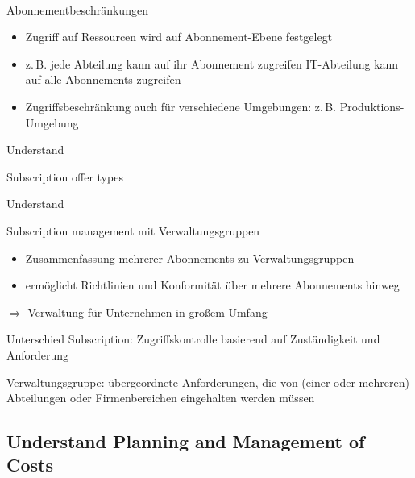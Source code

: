 \documentclass{scrartcl}
\newenvironment{flashcard}[2][]{%
    #1
    \vfill
    \centerline{\Large{#2}}
    \vfill
\newpage
}
{\newpage}
\newcommand{\subsectioncard}[1]{
    \vspace*{\stretch{1}}
    \subsection{#1}
    \vspace*{\stretch{1}}
    \pagebreak
}
\begin{document}
    \begin{flashcard}[\ ]{Abonnementbeschränkungen}
        \begin{itemize}
            \item Zugriff auf Ressourcen wird auf Abonnement-Ebene festgelegt
            \item z.\,B. jede Abteilung kann auf ihr Abonnement zugreifen\newline
            IT-Abteilung kann auf alle Abonnements zugreifen
            \item Zugriffsbeschränkung auch für verschiedene Umgebungen:\newline
            z.\,B. Produktions-Umgebung
        \end{itemize}
    \end{flashcard}

    \begin{flashcard}[Understand]{Subscription offer types}

    \end{flashcard}

    \begin{flashcard}[Understand]{Subscription management mit Verwaltungsgruppen}
        \begin{itemize}
            \item Zusammenfassung mehrerer Abonnements zu Verwaltungsgruppen
            \item ermöglicht Richtlinien und Konformität über mehrere Abonnements hinweg
        \end{itemize}
        $\Rightarrow$ Verwaltung für Unternehmen in großem Umfang

        \vspace{5mm}
        Unterschied Subscription: Zugriffskontrolle basierend auf Zuständigkeit und Anforderung
        
        Verwaltungsgruppe: übergeordnete Anforderungen, die von (einer oder mehreren) Abteilungen oder Firmenbereichen eingehalten werden müssen
    \end{flashcard}

    \subsectioncard{Understand Planning and Management of Costs}
\end{document}
